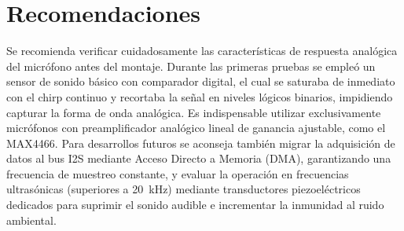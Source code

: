 \documentclass[journal]{IEEEtran}
\begin{document}
\section{Recomendaciones}
Se recomienda verificar cuidadosamente las caracter\'isticas de respuesta anal\'ogica del micr\'ofono antes del montaje. Durante las primeras pruebas se emple\'o un sensor de sonido b\'asico con comparador digital, el cual se saturaba de inmediato con el chirp continuo y recortaba la se\~nal en niveles l\'ogicos binarios, impidiendo capturar la forma de onda anal\'ogica. Es indispensable utilizar exclusivamente micr\'ofonos con preamplificador anal\'ogico lineal de ganancia ajustable, como el MAX4466. Para desarrollos futuros se aconseja tambi\'en migrar la adquisici\'on de datos al bus I2S mediante Acceso Directo a Memoria (DMA), garantizando una frecuencia de muestreo constante, y evaluar la operaci\'on en frecuencias ultras\'onicas (superiores a 20~kHz) mediante transductores piezoel\'ectricos dedicados para suprimir el sonido audible e incrementar la inmunidad al ruido ambiental.

\end{document}
